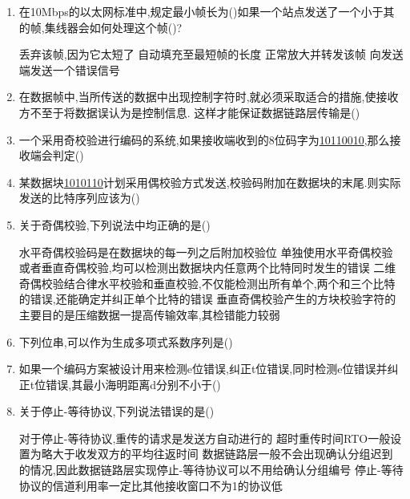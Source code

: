 \documentclass[12pt, a4paper, oneside, UTF8]{ctexbook}
\begin{document}
\begin{enumerate}
    \item 在10Mbps的以太网标准中,规定最小帧长为(\qquad)如果一个站点发送了一个小于其的帧,集线器会如何处理这个帧(\qquad)? 
    \begin{choices}[1]
        \task 丢弃该帧,因为它太短了
        \task 自动填充至最短帧的长度
        \task 正常放大并转发该帧
        \task 向发送端发送一个错误信号
    \end{choices}

    \item 在数据帧中,当所传送的数据中出现控制字符时,就必须采取适合的措施,使接收方不至于将数据误认为是控制信息.
    这样才能保证数据链路层传输是(\qquad)

    \item 一个采用奇校验进行编码的系统,如果接收端收到的8位码字为\underline{10110010},那么接收端会判定(\qquad)

    \item 某数据块\underline{1010110}计划采用偶校验方式发送,校验码附加在数据块的末尾.则实际发送的比特序列应该为(\qquad)
    \item 关于奇偶校验,下列说法中均正确的是(\qquad)
    \begin{choices}[1]
        \task 水平奇偶校验码是在数据块的每一列之后附加校验位
        \task 单独使用水平奇偶校验或者垂直奇偶校验,均可以检测出数据块内任意两个比特同时发生的错误
        \task 二维奇偶校验结合律水平校验和垂直校验,不仅能检测出所有单个,两个和三个比特的错误,还能确定并纠正单个比特的错误
        \task 垂直奇偶校验产生的方块校验字符的主要目的是压缩数据一提高传输效率,其检错能力较弱
    \end{choices}

    \item 下列位串,可以作为生成多项式系数序列是(\qquad)
    \begin{choices}
           
    \end{choices}

    \item 如果一个编码方案被设计用来检测e位错误,纠正t位错误,同时检测e位错误并纠正t位错误,其最小海明距离d分别不小于(\qquad)
    \item 关于停止-等待协议,下列说法错误的是(\qquad)
    \begin{choices}[1]
        \task 对于停止-等待协议,重传的请求是发送方自动进行的
        \task 超时重传时间RTO一般设置为略大于收发双方的平均往返时间
        \task 数据链路层一般不会出现确认分组迟到的情况,因此数据链路层实现停止-等待协议可以不用给确认分组编号
        \task 停止-等待协议的信道利用率一定比其他接收窗口不为1的协议低
    \end{choices}


\end{enumerate}
\end{document}
